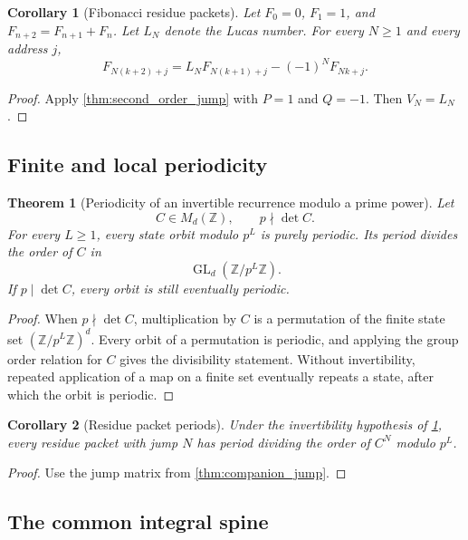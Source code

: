 \documentclass{aomart}
\newtheorem{theorem}{Theorem}[section]
\newtheorem{corollary}[corollary]{Corollary}
\theoremstyle{definition}
\theoremstyle{remark}
\newcommand{\ZZ}{\mathbb Z}
\begin{document}
\begin{corollary}[Fibonacci residue packets]\label{cor:fibonacci_packets}
Let \(F_0=0\), \(F_1=1\), and \(F_{n+2}=F_{n+1}+F_n\). Let \(L_N\) denote the Lucas number. For every \(N\geq1\) and every address \(j\),
\[
\boxed{

F_{N(k+2)+j}
=
L_NF_{N(k+1)+j}
-(-1)^NF_{Nk+j}.
}
\]
\end{corollary}

\begin{proof}
Apply \cref{thm:second_order_jump} with \(P=1\) and \(Q=-1\). Then \(V_N=L_N\).
\end{proof}

\subsection{Finite and local periodicity}

\begin{theorem}[Periodicity of an invertible recurrence modulo a prime power]\label{thm:recurrence_periodicity}
Let
\[
C\in M_d(\ZZ),
\qquad
p\nmid\det C.
\]
For every \(L\geq1\), every state orbit modulo \(p^L\) is purely periodic. Its period divides the order of \(C\) in
\[
\operatorname{GL}_d(\ZZ/p^L\ZZ).
\]
If \(p\mid\det C\), every orbit is still eventually periodic.
\end{theorem}

\begin{proof}
When \(p\nmid\det C\), multiplication by \(C\) is a permutation of the finite state set \((\ZZ/p^L\ZZ)^d\). Every orbit of a permutation is periodic, and applying the group order relation for \(C\) gives the divisibility statement. Without invertibility, repeated application of a map on a finite set eventually repeats a state, after which the orbit is periodic.
\end{proof}

\begin{corollary}[Residue packet periods]\label{cor:residue_packet_periods}
Under the invertibility hypothesis of \cref{thm:recurrence_periodicity}, every residue packet with jump \(N\) has period dividing the order of \(C^N\) modulo \(p^L\).
\end{corollary}

\begin{proof}
Use the jump matrix from \cref{thm:companion_jump}.
\end{proof}

\subsection{The common integral spine}
\end{document}
